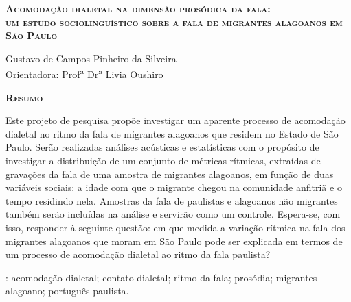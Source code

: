 \documentclass[
		a4paper,	%
		12pt,		%
		]{article}	%
\begin{document}
    
		
	{ %
		\begin{center} {\bfseries\Large\scshape Acomodação dialetal na dimensão
				prosódica da fala: \\um estudo sociolinguístico sobre a fala de
				migrantes alagoanos em São Paulo } \end{center} }
	\vspace{0.35em}

	{ %

		\begin{flushright} 
			Gustavo de Campos Pinheiro da Silveira \\ 
			\vspace{5pt}
			Orientadora: Prof\textsuperscript{a} Dr\textsuperscript{a} Livia Oushiro
		\end{flushright}

		\begin{center} 
			{\bfseries\scshape Resumo} \\ 
		\end{center}
			Este projeto de pesquisa propõe investigar um aparente processo de
			acomodação dialetal no ritmo da fala de migrantes alagoanos que
			residem no Estado de São Paulo. Serão realizadas análises acústicas
			e estatísticas com o propósito de investigar a distribuição de um
			conjunto de métricas rítmicas, extraídas de gravações da fala de uma
			amostra de migrantes alagoanos, em função de duas variáveis sociais:
			a idade com que o migrante chegou na comunidade anfitriã e o tempo
			residindo nela. Amostras da fala de paulistas e alagoanos não
			migrantes também serão incluídas na análise e servirão como um
			controle. Espera-se, com isso, responder à seguinte questão: em que
			medida a variação rítmica na fala dos migrantes alagoanos que moram
			em São Paulo pode ser explicada em termos de um processo de
			acomodação dialetal ao ritmo da fala paulista?
		\par
		\vspace{1.35em}
		: acomodação dialetal;
			contato dialetal; ritmo da fala; prosódia; migrantes alagoano; português paulista.
			
	}
\end{document}
